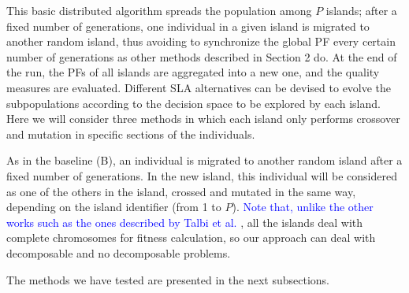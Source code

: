 \documentclass[preprint]{elsarticle}
\begin{document}
This basic distributed algorithm spreads the population among $P$
islands; after a fixed number of generations,
one individual in a given island is migrated to another random island,
thus avoiding to synchronize the global PF every
certain number of generations as other methods described in Section 2
do. At the end of the run, the PFs of all islands are
aggregated into a new one, and the quality measures are evaluated. 
Different  SLA alternatives can be devised to evolve the
subpopulations according to the decision space to be explored by each
island. Here we will consider three methods in which each island only
performs crossover and mutation in specific sections of the
individuals. 



%

As in the baseline (B), an individual is migrated to another random
island after a fixed number of generations. In the new island, this
individual will be considered as one of the others in the island,
crossed and mutated in the same way, depending on the island
identifier (from 1 to $P$). \textcolor{blue}{Note that, unlike the other works such as the ones
described by Talbi et al. \citep{Talbi08Parallel}}, all the islands deal
with complete chromosomes for fitness calculation, so our approach can
deal with decomposable and no decomposable problems. %

The methods we have tested are presented in the next subsections. 
\end{document}
